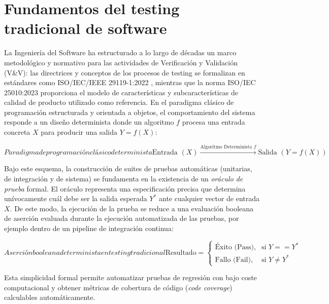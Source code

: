\section{Fundamentos del testing tradicional de software}
\label{sec:testing_tradicional}
La Ingeniería del Software ha estructurado a lo largo de décadas un marco metodológico y normativo para las actividades de Verificación y Validación (V\&V): las directrices y conceptos de los procesos de testing se formalizan en estándares como ISO/IEC/IEEE 29119-1:2022 \cite{iso29119}, mientras que la norma ISO/IEC 25010:2023 \cite{iso25010} proporciona el modelo de características y subcaracterísticas de calidad de producto utilizado como referencia. En el paradigma clásico de programación estructurada y orientada a objetos, el comportamiento del sistema responde a un diseño determinista donde un algoritmo $f$ procesa una entrada concreta $X$ para producir una salida $Y = f(X)$:

\begin{equation}[EQ:FLUJOCLASICO]{Paradigma de programación clásico determinista}
    \text{Entrada } (X) \xrightarrow{\text{Algoritmo Determinista } f} \text{Salida } (Y = f(X))
\end{equation}

Bajo este esquema, la construcción de suites de pruebas automáticas (unitarias, de integración y de sistema) se fundamenta en la existencia de un \textit{oráculo de prueba} formal. El oráculo representa una especificación precisa que determina unívocamente cuál debe ser la salida esperada $Y^*$ ante cualquier vector de entrada $X$. De este modo, la ejecución de la prueba se reduce a una evaluación booleana de aserción evaluada durante la ejecución automatizada de las pruebas, por ejemplo dentro de un pipeline de integración continua:

\begin{equation}[EQ:ORACULOCLASICO]{Aserción booleana determinista en testing tradicional}
    \text{Resultado} = 
    \begin{cases} 
      \text{Éxito (Pass)}, & \text{si } Y == Y^* \\
      \text{Fallo (Fail)}, & \text{si } Y \neq Y^* 
    \end{cases}
\end{equation}

Esta simplicidad formal permite automatizar pruebas de regresión con bajo coste computacional y obtener métricas de cobertura de código (\textit{code coverage}) calculables automáticamente.

